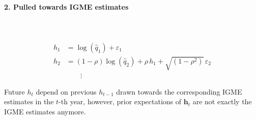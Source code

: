 \documentclass[12pt,a4paper]{article}
\begin{document}
\paragraph{2. Pulled towards IGME estimates} \\~\\
\begin{align*}
h_1 &= \log(\hat{q}_1) + \varepsilon_1 \\
h_2 &= (1-\rho)\log(\hat{q}_2) + \rho \, h_1 + \sqrt{(1 - \rho^2)} \, \varepsilon_2 \\
& \qquad \vdots
\end{align*}

Future $h_t$ depend on previous $h_{t-1}$ drawn towards the corresponding IGME estimates in the $t$-th year, however, prior expectations of $\boldsymbol{h}_t$ are not exactly the IGME estimates anymore.
\end{document}
